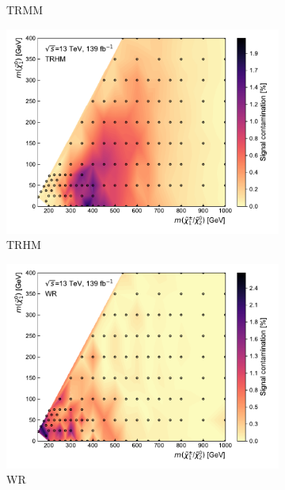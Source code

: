 \begin{figure}
\begin{subfigure}[b]{0.5\linewidth}
		\caption{TRMM\label{fig:signal_contamination_TRMM}}
	\end{subfigure}\hfill
	\begin{subfigure}[b]{0.5\linewidth}
		\centering\includegraphics[width=1.0\textwidth]{signal_contamination/plot_TRHM}
		\caption{TRHM\label{fig:signal_contamination_TRHM}}
	\end{subfigure}\hfill
	\begin{subfigure}[b]{0.5\linewidth}
		\centering\includegraphics[width=1.0\textwidth]{signal_contamination/plot_WR}
		\caption{WR\label{fig:signal_contamination_WR}}
	\end{subfigure}\hfill
	\begin{subfigure}[b]{0.5\linewidth}

\end{subfigure}
\end{figure}
